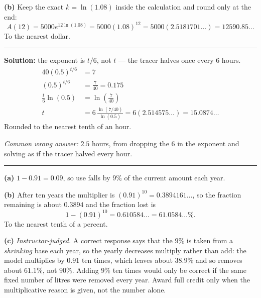 \documentclass[12pt]{article}
\begin{document}
\textbf{(b)} Keep the exact $k = \ln(1.08)$ inside the calculation and round only at the end:
\[ A(12) = 5000e^{12\ln(1.08)} = 5000(1.08)^{12} = 5000(2.5181701\ldots) = 12590.85\ldots \]
To the nearest dollar. 

\vspace{0.2cm}\noindent\rule{\linewidth}{0.2pt}\vspace{0.2cm}


\textbf{Solution:} the exponent is $t/6$, not $t$ --- the tracer halves once every $6$ hours.
\begin{align*}
  40(0.5)^{t/6} &= 7 \\
  (0.5)^{t/6} &= \frac{7}{40} = 0.175 \\
  \frac{t}{6}\ln(0.5) &= \ln\!\left(\frac{7}{40}\right) \\
  t &= 6\,\frac{\ln(7/40)}{\ln(0.5)} = 6(2.514575\ldots) = 15.0874\ldots
\end{align*}
Rounded to the nearest tenth of an hour. 

\smallskip
\noindent\textit{Common wrong answer:} $2.5$ hours, from dropping the $6$ in the exponent and solving as if the tracer halved every hour.

\vspace{0.2cm}\noindent\rule{\linewidth}{0.2pt}\vspace{0.2cm}


\textbf{(a)} $1 - 0.91 = 0.09$, so use falls by $9\%$ of the current amount each year. 

\textbf{(b)} After ten years the multiplier is $(0.91)^{10} = 0.3894161\ldots$, so the fraction remaining is about $0.3894$ and the fraction lost is
\[ 1 - (0.91)^{10} = 0.610584\ldots = 61.0584\ldots\% . \]
To the nearest tenth of a percent. 

\textbf{(c)} \emph{Instructor-judged.} A correct response says that the $9\%$ is taken from a \emph{shrinking} base each year, so the yearly decreases multiply rather than add: the model multiplies by $0.91$ ten times, which leaves about $38.9\%$ and so removes about $61.1\%$, not $90\%$. Adding $9\%$ ten times would only be correct if the same fixed number of litres were removed every year. Award full credit only when the multiplicative reason is given, not the number alone.
\end{document}
